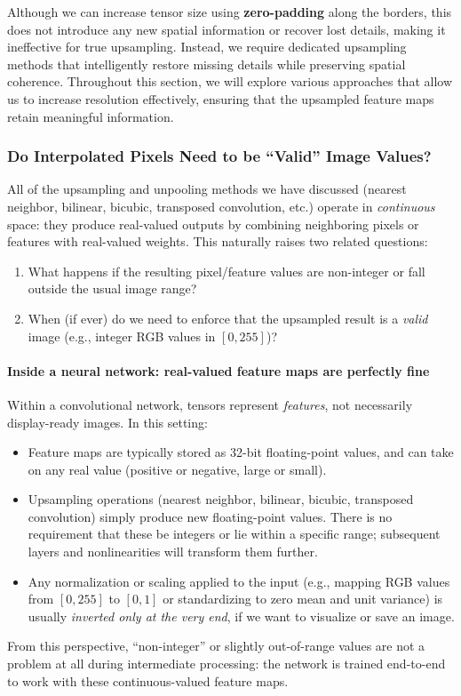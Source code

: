 \noindent Although we can increase tensor size using \textbf{zero-padding} along the borders, this does not introduce any new spatial information or recover lost details, making it ineffective for true upsampling. Instead, we require dedicated upsampling methods that intelligently restore missing details while preserving spatial coherence. Throughout this section, we will explore various approaches that allow us to increase resolution effectively, ensuring that the upsampled feature maps retain meaningful information.

\newpage

\subsubsection{Do Interpolated Pixels Need to be ``Valid'' Image Values?}
\label{subsec:chapter15_valid_pixels}
\noindent
All of the upsampling and unpooling methods we have discussed (nearest neighbor, bilinear, bicubic, transposed convolution, etc.) operate in \emph{continuous} space: they produce real-valued outputs by combining neighboring pixels or features with real-valued weights. This naturally raises two related questions:
\begin{enumerate}
	\item What happens if the resulting pixel/feature values are non-integer or fall outside the usual image range?
	\item When (if ever) do we need to enforce that the upsampled result is a \emph{valid} image (e.g., integer RGB values in \([0, 255]\))?
\end{enumerate}

\paragraph{Inside a neural network: real-valued feature maps are perfectly fine}
\noindent
Within a convolutional network, tensors represent \emph{features}, not necessarily display-ready images. In this setting:
\begin{itemize}
	\item Feature maps are typically stored as 32-bit floating-point values, and can take on any real value (positive or negative, large or small).
	\item Upsampling operations (nearest neighbor, bilinear, bicubic, transposed convolution) simply produce new floating-point values. There is no requirement that these be integers or lie within a specific range; subsequent layers and nonlinearities will transform them further.
	\item Any normalization or scaling applied to the input (e.g., mapping RGB values from \([0,255]\) to \([0,1]\) or standardizing to zero mean and unit variance) is usually \emph{inverted only at the very end}, if we want to visualize or save an image.
\end{itemize}
From this perspective, ``non-integer'' or slightly out-of-range values are not a problem at all during intermediate processing: the network is trained end-to-end to work with these continuous-valued feature maps.

